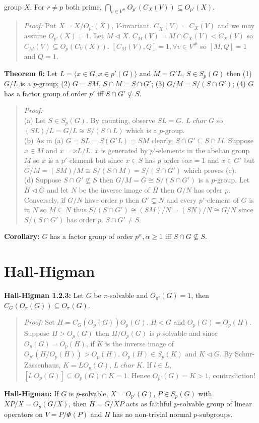 group $X$.  For $r \ne p$ both prime, 
$\bigcap_{v \in V^{\#}} O_{p'}(C_X(V)) \subseteq O_{p'}(X)$.
\begin{quote}
\emph{Proof:}
Put ${\overline X}= X/O_{p'}(X)$, $V$-invariant.
$C_{\overline X}(V)= {\overline {C_X(V)}}$ and we may assume $O_{p'}(X)=1$.
Let $M \lhd X$.
$C_M(V)= M \cap C_X(V) \lhd C_X(V)$ so  $C_M(V) \subseteq O_p(C_V(X))$.
$[C_M(V), Q]= 1, \forall v \in V^{\#}$ so $[M, Q] =1$ and $Q=1$.
\end{quote}
{\bf Theorem 6:}
Let $L= \langle x \in G, x \in p'(G) \rangle $ and $M=G'L$, $S \in S_p(G)$ then
(1) $G/L$ is a $p$-group; (2) $G=SM$, $S \cap M = S \cap G'$;
(3) $G/M= S/(S \cap G')$; (4) $G$ has a factor group of order
$p'$ iff $S \cap G' \nsubseteq S$.
\begin{quote}
\emph{Proof:}
\\
(a) Let $S \in S_p(G)$.  By counting, observe $SL=G$.  $L \; char \; G$ so
$(SL)/L= G/L \cong S/(S \cap L)$ which is a $p$-group.
\\
(b) As in (a) $G= SL = S(G'L) = SM$ clearly, $S \cap G' \subseteq S \cap M$.
Suppose $x \in M$ and ${\overline x} = xL/L$.  ${\overline x}$ is generated
by $p'$-elements in the abelian group ${\overline M}$ so ${\overline x}$ is
a $p'$-element but since $x \in S$ has $p$ order so${\overline x} =1$ and
$x \in G'$ but $G/M = (SM)/M \cong S/(S \cap M) = S/(S \cap G')$ which proves (c).
\\
(d) 
Suppose $S \cap G' \nsubseteq S$ then $G/M= {\overline G} \cong S/(S \cap G')$ is a 
$p$-group.  Let ${\overline H} \lhd {\overline G}$ and let $N$ be the inverse image
of ${\overline H}$ then $G/N$ has order $p$.  Conversely,
if $G/N$ have order $p$ then $G' \subseteq N$ and every $p'$-element of $G$ is in
$N$ so $M \subseteq N$ thus $S/(S \cap G') \cong (SM)/N = (SN)/N \cong G/N$
since $S/(S \cap G')$ has order $p$.
$S \cap G' \ne S$.
\end{quote}
{\bf Corollary:} $G$ has a factor group of order $p^{\alpha}, \alpha \ge 1$ iff
$S \cap G \nsubseteq S$.
\section {Hall-Higman}
{\bf Hall-Higman 1.2.3:}  
Let $G$ be $\pi$-solvable and $O_{\pi'}(G)=1$, then
$C_G(O_{\pi}(G)) \subseteq O_{\pi}(G)$.
\begin{quote}
\emph{Proof:}  
Set $H= C_G(O_p(G)) O_p(G)$.  $H \lhd G$ 
and $O_p(G)=O_p(H)$.
Suppose $H > O_p(G)$ then $H/O_p(G)$ is $p$-solvable 
and since $O_p(G)=O_p(H)$, if $K$ is the inverse image of $O_{p'}(H/O_p(H)) > O_p(H)$.
$O_p(H) \in S_p(K)$ and $K \lhd G$.
By Schur-Zassenhaus, $K=L O_p(G)$, $L \; char \; K$.  
If $l \in L$, $[l, O_p(G)] \subseteq O_p(G) \cap K =1$.  Hence $O_{p'}(G)= K >1$, contradiction!
\end{quote}
{\bf Hall-Higman:} If $G$ is $p$-solvable, $X= O_{p'}(G)$, $P \in S_p(G)$ with
$XP/X= O_p(G/X)$, then $H=G/XP$ acts as faithful $p$-solvable group of linear
operators on $V= P/\Phi(P)$ and $H$ has no non-trivial normal $p$-subgroups.
